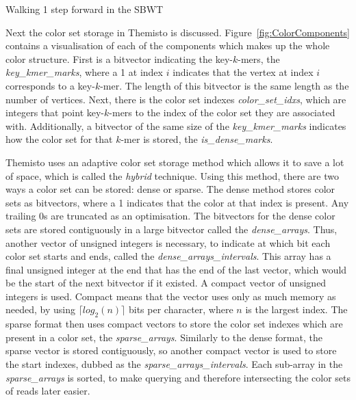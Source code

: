 \begin{algorithm}

	\caption{Walking 1 step forward in the SBWT}\label{alg:MovingForward}
\end{algorithm}

Next the color set storage in Themisto is discussed.
Figure~\ref{fig:ColorComponents} contains a visualisation of each of the components which makes up the whole color structure.
First is a bitvector indicating the key-$k$-mers, the \textit{key\_kmer\_marks}, where a 1 at index $i$ indicates that the vertex at index $i$ corresponds to a key-$k$-mer.
The length of this bitvector is the same length as the number of vertices.
Next, there is the color set indexes \textit{color\_set\_idxs}, which are integers that point key-$k$-mers to the index of the color set they are associated with.
Additionally, a bitvector of the same size of the \textit{key\_kmer\_marks} indicates how the color set for that $k$-mer is stored, the \textit{is\_dense\_marks}.

Themisto uses an adaptive color set storage method which allows it to save a lot of space, which is called the \textit{hybrid} technique.
Using this method, there are two ways a color set can be stored: dense or sparse.
The dense method stores color sets as bitvectors, where a 1 indicates that the color at that index is present.
Any trailing 0s are truncated as an optimisation.
The bitvectors for the dense color sets are stored contiguously in a large bitvector called the \textit{dense\_arrays}.
Thus, another vector of unsigned integers is necessary, to indicate at which bit each color set starts and ends, called the \textit{dense\_arrays\_intervals}.
This array has a final unsigned integer at the end that has the end of the last vector, which would be the start of the next bitvector if it existed.
A compact vector of unsigned integers is used.
Compact means that the vector uses only as much memory as needed, by using $\lceil log_2(n) \rceil$ bits per character, where $n$ is the largest index.
The sparse format then uses compact vectors to store the color set indexes which are present in a color set, the \textit{sparse\_arrays}.
Similarly to the dense format, the sparse vector is stored contiguously, so another compact vector is used to store the start indexes, dubbed as the \textit{sparse\_arrays\_intervals}.
Each sub-array in the \textit{sparse\_arrays} is sorted, to make querying and therefore intersecting the color sets of reads later easier.

